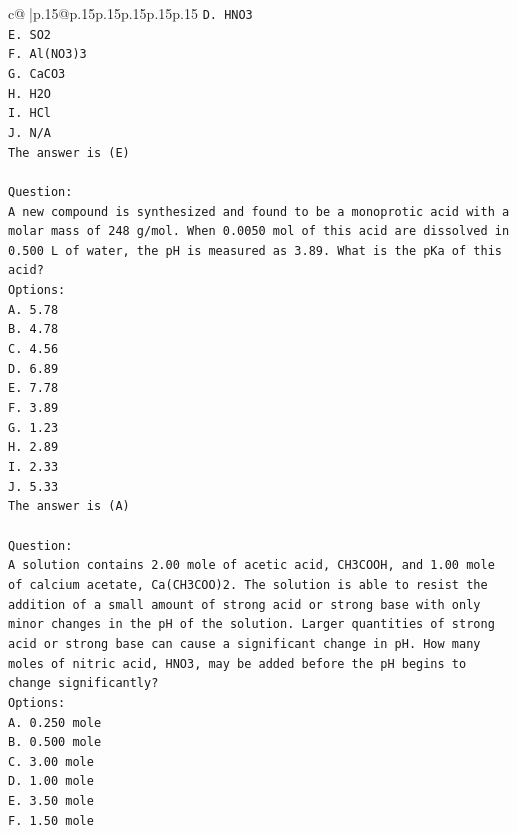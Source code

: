 \documentclass{article}
\begin{document}
{\begin{supertabular}{c@{$\;$}|p{.15\linewidth}@{}p{.15\linewidth}p{.15\linewidth}p{.15\linewidth}p{.15\linewidth}p{.15\linewidth}}
{{{\texttt{D. HNO3} \\
\texttt{E. SO2} \\
\texttt{F. Al(NO3)3} \\
\texttt{G. CaCO3} \\
\texttt{H. H2O} \\
\texttt{I. HCl} \\
\texttt{J. N/A} \\
\texttt{The answer is (E)} \\
\\ 
\texttt{Question:} \\
\texttt{A new compound is synthesized and found to be a monoprotic acid with a molar mass of 248 g/mol. When 0.0050 mol of this acid are dissolved in 0.500 L of water, the pH is measured as 3.89. What is the pKa of this acid?} \\
\texttt{Options:} \\
\texttt{A. 5.78} \\
\texttt{B. 4.78} \\
\texttt{C. 4.56} \\
\texttt{D. 6.89} \\
\texttt{E. 7.78} \\
\texttt{F. 3.89} \\
\texttt{G. 1.23} \\
\texttt{H. 2.89} \\
\texttt{I. 2.33} \\
\texttt{J. 5.33} \\
\texttt{The answer is (A)} \\
\\ 
\texttt{Question:} \\
\texttt{A solution contains 2.00 mole of acetic acid, CH3COOH, and 1.00 mole of calcium acetate, Ca(CH3COO)2. The solution is able to resist the addition of a small amount of strong acid or strong base with only minor changes in the pH of the solution. Larger quantities of strong acid or strong base can cause a significant change in pH. How many moles of nitric acid, HNO3, may be added before the pH begins to change significantly?} \\
\texttt{Options:} \\
\texttt{A. 0.250 mole} \\
\texttt{B. 0.500 mole} \\
\texttt{C. 3.00 mole} \\
\texttt{D. 1.00 mole} \\
\texttt{E. 3.50 mole} \\
\texttt{F. 1.50 mole} \\
}}}
\end{supertabular}}
\end{document}
